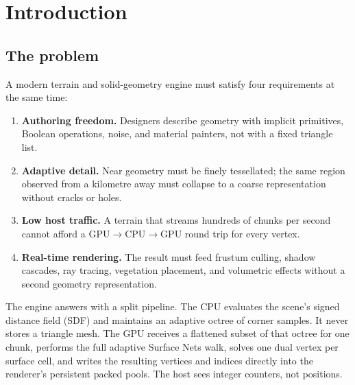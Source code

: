 \section{Introduction}
\label{sec:intro}

\subsection{The problem}

A modern terrain and solid-geometry engine must satisfy four requirements
at the same time:

\begin{enumerate}[label=\textbf{R\arabic*.},leftmargin=2.2em]
\item \textbf{Authoring freedom.}  Designers describe geometry with
  implicit primitives, Boolean operations, noise, and material painters,
  not with a fixed triangle list.
\item \textbf{Adaptive detail.}  Near geometry must be finely tessellated;
  the same region observed from a kilometre away must collapse to a coarse
  representation without cracks or holes.
\item \textbf{Low host traffic.}  A terrain that streams hundreds of
  chunks per second cannot afford a GPU$\rightarrow$CPU$\rightarrow$GPU
  round trip for every vertex.
\item \textbf{Real-time rendering.}  The result must feed frustum culling,
  shadow cascades, ray tracing, vegetation placement, and volumetric
  effects without a second geometry representation.
\end{enumerate}

The engine answers with a split pipeline.  The CPU evaluates the scene's
signed distance field (SDF) and maintains an adaptive octree of corner
samples.  It never stores a triangle mesh.  The GPU receives a flattened
subset of that octree for one chunk, performs the full adaptive Surface
Nets walk, solves one dual vertex per surface cell, and writes the
resulting vertices and indices directly into the renderer's persistent
packed pools.  The host sees integer counters, not positions.

